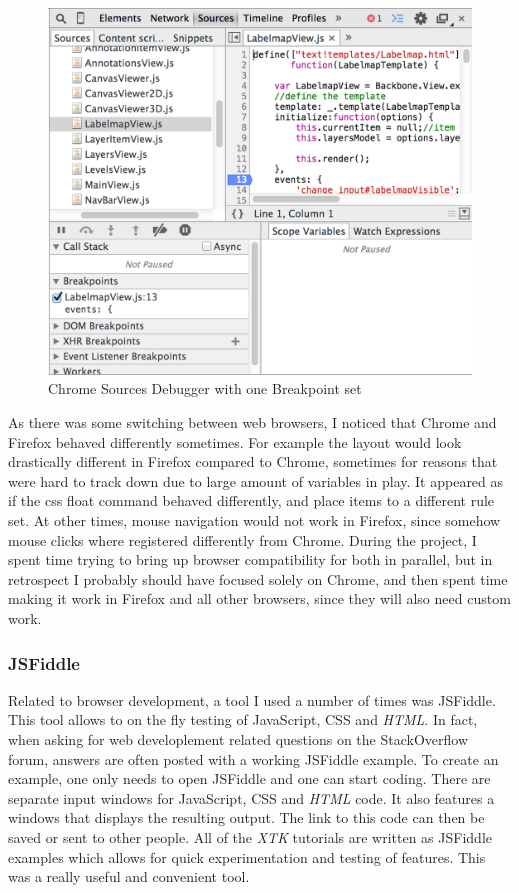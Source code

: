\documentclass[a4paper,11pt,twoside]{article}
\begin{document}
\begin{figure}[ht!]
\centering
\includegraphics[width=140mm]{graphics/chromeDebugger_01.png}
\caption{Chrome Sources Debugger with one Breakpoint set}
\label{fig:UIdesign1}
\end{figure}



As there was some switching between web browsers, I noticed that Chrome and Firefox behaved differently sometimes. For example the layout would look drastically different in Firefox compared to Chrome, sometimes for reasons that were hard to track down due to large amount of variables in play. It appeared as if the css float command behaved differently, and place items to a different rule set. At other times, mouse navigation would not work in Firefox, since somehow mouse clicks where registered differently from Chrome. During the project, I spent time trying to bring up browser compatibility for both in parallel, but in retrospect I probably should have focused solely on Chrome, and then spent time making it work in Firefox and all other browsers, since they will also need custom work.


\subsubsection{JSFiddle}

Related to browser development, a tool I used a number of times was JSFiddle. This tool allows to on the fly testing of JavaScript, CSS and \textit{HTML}. In fact, when asking for web developlement related questions on the StackOverflow forum, answers are often posted with a working JSFiddle example. To create an example, one only needs to open JSFiddle and one can start coding. There are separate input windows for JavaScript, CSS and \textit{HTML} code. It also features a windows that displays the resulting output. The link to this code can then be saved or sent to other people. All of the \textit{XTK} tutorials are written as JSFiddle examples which allows for quick experimentation and testing of features. This was a really useful and convenient tool. 
\end{document}
